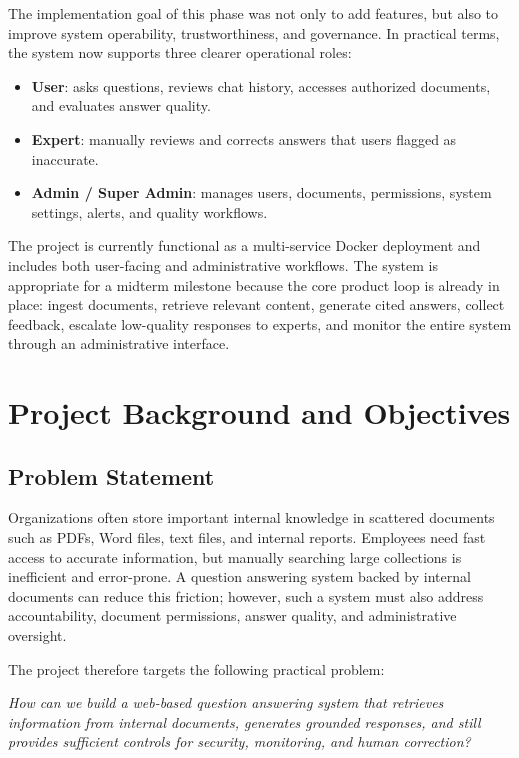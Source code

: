 \documentclass[12pt,a4paper]{report}
\begin{document}
The implementation goal of this phase was not only to add features, but also to improve system operability, trustworthiness, and governance. In practical terms, the system now supports three clearer operational roles:
\begin{itemize}[leftmargin=1.5em]
\item \textbf{User}: asks questions, reviews chat history, accesses authorized documents, and evaluates answer quality.
\item \textbf{Expert}: manually reviews and corrects answers that users flagged as inaccurate.
\item \textbf{Admin / Super Admin}: manages users, documents, permissions, system settings, alerts, and quality workflows.
\end{itemize}

The project is currently functional as a multi-service Docker deployment and includes both user-facing and administrative workflows. The system is appropriate for a midterm milestone because the core product loop is already in place: ingest documents, retrieve relevant content, generate cited answers, collect feedback, escalate low-quality responses to experts, and monitor the entire system through an administrative interface.

\chapter{Project Background and Objectives}

\section{Problem Statement}

Organizations often store important internal knowledge in scattered documents such as PDFs, Word files, text files, and internal reports. Employees need fast access to accurate information, but manually searching large collections is inefficient and error-prone. A question answering system backed by internal documents can reduce this friction; however, such a system must also address accountability, document permissions, answer quality, and administrative oversight.

The project therefore targets the following practical problem:

\textit{How can we build a web-based question answering system that retrieves information from internal documents, generates grounded responses, and still provides sufficient controls for security, monitoring, and human correction?}
\end{document}
